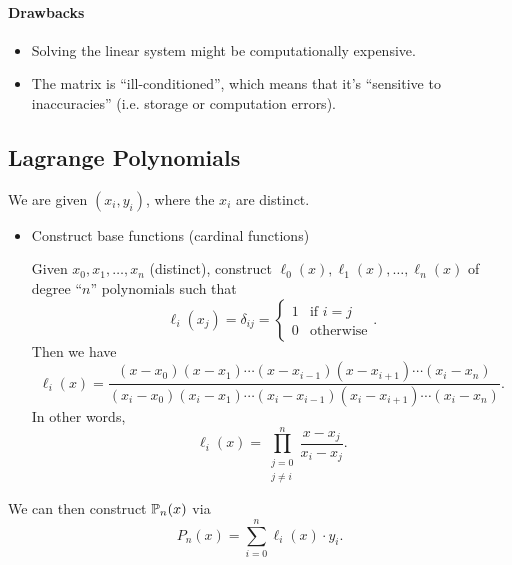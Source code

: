 \documentclass[class=article, crop=false]{standalone}
\begin{document}
  \paragraph{Drawbacks}
  \begin{itemize}
    \item Solving the linear system might be computationally expensive.
    \item The matrix is ``ill-conditioned'', which means that it's ``sensitive to inaccuracies'' (i.e. storage or computation errors).
  \end{itemize}
  \subsection{Lagrange Polynomials}
  We are given $(x_i, y_i)$, where the $x_i$ are distinct.
  \begin{itemize}
    \item Construct base functions (cardinal functions) \par
    Given $x_0,x_1,\dotsc,x_n$ (distinct), construct $\ell_0(x), \ell_1(x),\dotsc,\ell_n(x)$ of degree ``$n$'' polynomials such that
    \[
      \ell_i(x_j) = \delta_{ij} = \begin{cases}1 & \text{if }i = j \\ 0 &\text{otherwise}\end{cases}.
    \]
    Then we have
    \[
      \ell_i(x) = \frac{(x - x_0)(x - x_1)\dotsb(x - x_{i - 1})(x - x_{i + 1})\dotsb(x_i - x_n)}{(x_i - x_0)(x_i - x_1)\dotsb(x_i - x_{i - 1})(x_i - x_{i + 1})\dotsb(x_i - x_n)}.
    \]
    In other words,
    \[
      \ell_i(x) = \prod_{\substack{j = 0\\j\neq i}}^n \frac{x - x_j}{x_i - x_j}.
    \]
  \end{itemize}
  We can then construct $\P_n(x)$ via
  \[
    P_n(x) = \sum_{i=0}^{n}\ell_i(x)\cdot y_i.
  \]
\end{document}
